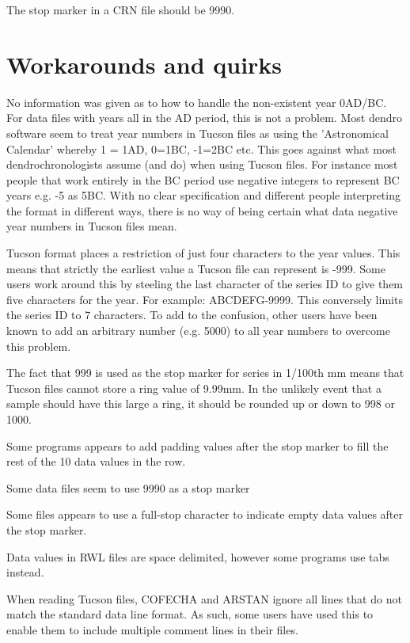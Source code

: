 The stop marker in a CRN file should be 9990. 

\section{Workarounds and quirks}

\begin{itemize*}
\item  No information was given as to how to handle the non-existent year 0AD/BC. For data files with years all in the AD period, this is not a problem. Most dendro software seem to treat year numbers in Tucson files as using the 'Astronomical Calendar' whereby 1 = 1AD, 0=1BC, -1=2BC etc. This goes against what most dendrochronologists assume (and do) when using Tucson files. For instance most people that work entirely in the BC period use negative integers to represent BC years e.g. -5 as 5BC. With no clear specification and different people interpreting the format in different ways, there is no way of being certain what data negative year numbers in Tucson files mean.
\item Tucson format places a restriction of just four characters to the year values. This means that strictly the earliest value a Tucson file can represent is -999. Some users work around this by steeling the last character of the series ID to give them five characters for the year. For example: ABCDEFG-9999. This conversely limits the series ID to 7 characters. To add to the confusion, other users have been known to add an arbitrary number (e.g. 5000) to all year numbers to overcome this problem.
\item  The fact that 999 is used as the stop marker for series in 1/100th mm means that Tucson files cannot store a ring value of 9.99mm. In the unlikely event that a sample should have this large a ring, it should be rounded up or down to 998 or 1000.
\item  Some programs appears to add padding values after the stop marker to fill the rest of the 10 data values in the row.
\item  Some data files seem to use 9990 as a stop marker
\item  Some files appears to use a full-stop character to indicate empty data values after the stop marker.
\item  Data values in RWL files are space delimited, however some programs use tabs instead.
\item  When reading Tucson files, COFECHA and ARSTAN ignore all lines that do not match the standard data line format. As such, some users have used this to enable them to include multiple comment lines in their files.

\end{itemize*}
